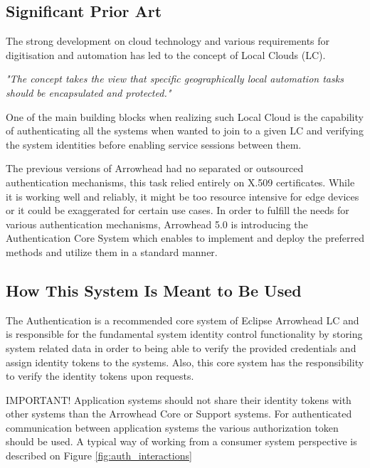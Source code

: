 \documentclass[a4paper]{arrowhead}
\begin{document}
\subsection{Significant Prior Art}
\label{sec:prior_art}

The strong development on cloud technology and various requirements for digitisation and automation has led to the concept of Local Clouds (LC).

\textit{"The concept takes the view that specific geographically local automation tasks should be encapsulated and protected."} \cite{jerker2017localclouds}

One of the main building blocks when realizing such Local Cloud is the capability of authenticating all the systems when wanted to join to a given LC and verifying the system identities before enabling service sessions between them. 

The previous versions of Arrowhead had no separated or outsourced authentication mechanisms, this task relied entirely on X.509 certificates. While it is working well and reliably, it might be too resource intensive for edge devices or it could be exaggerated for certain use cases. In order to fulfill the needs for various authentication mechanisms, Arrowhead 5.0 is introducing the Authentication Core System which enables to implement and deploy the preferred methods and utilize them in a standard manner.

\subsection{How This System Is Meant to Be Used}
\label{sec:use}

The Authentication is a recommended core system of Eclipse Arrowhead LC and is responsible for the fundamental system identity control functionality by storing system related data in order to being able to verify the provided credentials and assign identity tokens to the systems. Also, this core system has the responsibility to verify the identity tokens upon requests. 

IMPORTANT! Application systems should not share their identity tokens with other systems than the Arrowhead Core or Support systems. For authenticated communication between application systems the various authorization token should be used. A typical way of working from a consumer system perspective is described on Figure \ref{fig:auth_interactions}
\end{document}
